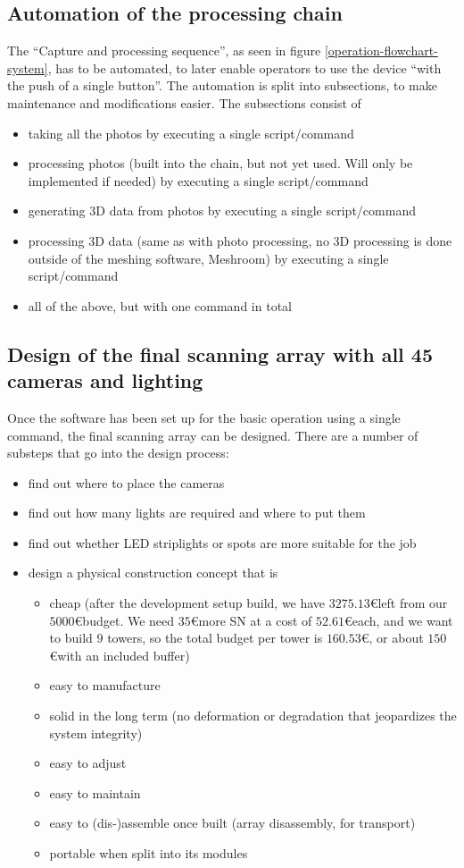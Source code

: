 \subsection{Automation of the processing chain}
	The \enquote{Capture and processing sequence}, as seen in figure \ref{operation-flowchart-system}, has to be automated, to later enable operators to use the device \enquote{with the push of a single button}. The automation is split into subsections, to make maintenance and modifications easier. The subsections consist of
	\begin{itemize}
		\item taking all the photos by executing a single script/command
		\item processing photos (built into the chain, but not yet used. Will only be implemented if needed) by executing a single script/command
		\item generating 3D data from photos by executing a single script/command
		\item processing 3D data (same as with photo processing, no 3D processing is done outside of the meshing software, Meshroom) by executing a single script/command
		\item all of the above, but with one command in total
	\end{itemize}
	
\subsection{Design of the final scanning array with all 45 cameras and lighting}
	Once the software has been set up for the basic operation using a single command, the final scanning array can be designed. There are a number of substeps that go into the design process:
	\begin{itemize}
		\item find out where to place the cameras
		\item find out how many lights are required and where to put them
		\item find out whether LED striplights or spots are more suitable for the job
		\item design a physical construction concept that is
		\begin{itemize}
			\item cheap (after the development setup build, we have $3275.13$\euro left from our $5000$\euro budget. We need $35$\euro more SN at a cost of $52.61$\euro each, and we want to build $9$ towers, so the total budget per tower is $160.53$\euro, or about $150$\euro with an included buffer)
			\item easy to manufacture
			\item solid in the long term (no deformation or degradation that jeopardizes the system integrity)
			\item easy to adjust
			\item easy to maintain
			\item easy to (dis-)assemble once built (array disassembly, for transport)		
			\item portable when split into its modules
		\end{itemize}
	\end{itemize}
	
